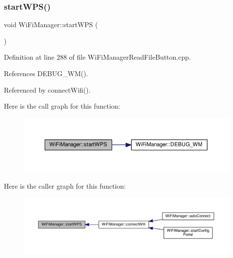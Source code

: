 \subsubsection{\texorpdfstring{start\+W\+P\+S()}{startWPS()}}
{\footnotesize\ttfamily void Wi\+Fi\+Manager\+::start\+W\+PS (\begin{DoxyParamCaption}{ }\end{DoxyParamCaption})\hspace{0.3cm}{\ttfamily [private]}}



Definition at line 288 of file Wi\+Fi\+Manager\+Read\+File\+Button.\+cpp.



References D\+E\+B\+U\+G\+\_\+\+W\+M().



Referenced by connect\+Wifi().

Here is the call graph for this function\+:\nopagebreak
\begin{figure}[H]
\begin{center}
\leavevmode
\includegraphics[width=350pt]{d4/dc8/class_wi_fi_manager_abcc403fc26a47f7a111d1271f1d0869e_cgraph}
\end{center}
\end{figure}
Here is the caller graph for this function\+:\nopagebreak
\begin{figure}[H]
\begin{center}
\leavevmode
\includegraphics[width=350pt]{d4/dc8/class_wi_fi_manager_abcc403fc26a47f7a111d1271f1d0869e_icgraph}
\end{center}
\end{figure}
\mbox{\label{class_wi_fi_manager_ae0ae27b5543b47585728c084c3bbdca7}} 
